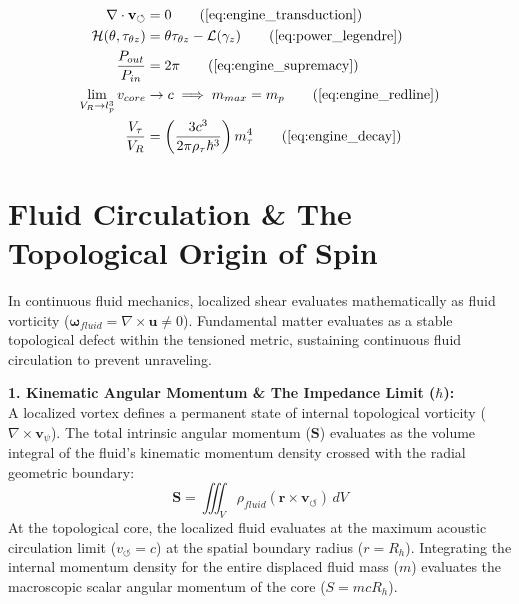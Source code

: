 \documentclass[11pt, a4paper]{article}
\begin{document}
\begin{tcolorbox}[recallbox, title={\ref{box:unified_engine}. The Unified Topological Engine}]
\begin{align}
    \nabla \cdot \mathbf{v}_{\circlearrowleft} &= 0 \tag{\ref{eq:engine_transduction}} \\
    \mathcal{H}(\theta, \tau_{\theta z}) &= \theta \tau_{\theta z} - \mathcal{L}(\gamma_z) \tag{\ref{eq:power_legendre}} \\
    \frac{P_{out}}{P_{in}} &= 2\pi \tag{\ref{eq:engine_supremacy}} \\
    \lim_{V_R \to l_p^3} v_{core} &\to c \implies m_{max} = m_p \tag{\ref{eq:engine_redline}} \\
    \frac{V_\tau}{V_R} &= \left(\frac{3c^3}{2\pi\rho_{\tau}\hbar^3}\right) m_\tau^4 \tag{\ref{eq:engine_decay}}
\end{align}
\end{tcolorbox}


\section{Fluid Circulation \& The Topological Origin of Spin}
\label{sec:deriv_quantum_spin}

In continuous fluid mechanics, localized shear evaluates mathematically as fluid vorticity ($\boldsymbol{\omega}_{fluid} = \nabla \times \mathbf{u} \neq 0$). Fundamental matter evaluates as a stable topological defect within the tensioned metric, sustaining continuous fluid circulation to prevent unraveling.

\textbf{1. Kinematic Angular Momentum \& The Impedance Limit ($\hbar$):} \\
A localized vortex defines a permanent state of internal topological vorticity ($\nabla \times \mathbf{v}_{\psi}$). The total intrinsic angular momentum ($\mathbf{S}$) evaluates as the volume integral of the fluid's kinematic momentum density crossed with the radial geometric boundary:
\begin{equation}
    \mathbf{S} = \iiint_V \rho_{fluid} (\mathbf{r} \times \mathbf{v}_{\circlearrowleft}) \, dV \nonumber
\end{equation}
At the topological core, the localized fluid evaluates at the maximum acoustic circulation limit ($v_{\circlearrowleft} = c$) at the spatial boundary radius ($r = R_h$). Integrating the internal momentum density for the entire displaced fluid mass ($m$) evaluates the macroscopic scalar angular momentum of the core ($S = mcR_h$). 
\end{document}
